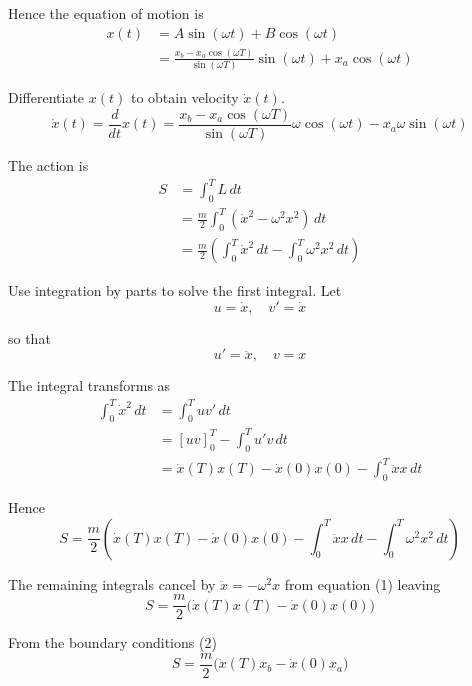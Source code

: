 Hence the equation of motion is
\begin{align*}
x(t)&=A\sin(\omega t)+B\cos(\omega t)
\\
&=\frac{x_b-x_a\cos(\omega T)}{\sin(\omega T)}\sin(\omega t)+x_a\cos(\omega t)
\tag{3}
\end{align*}

Differentiate $x(t)$ to obtain velocity $\dot x(t)$.
\begin{equation*}
\dot x(t)=\frac{d}{dt}x(t)
=\frac{x_b-x_a\cos(\omega T)}{\sin(\omega T)}\omega\cos(\omega t)-x_a\omega\sin(\omega t)
\tag{4}
\end{equation*}

The action is
\begin{align*}
S&=\int_0^TL\,dt
\\
&=\frac{m}{2}\int_0^T (\dot{x}^2-\omega^2 x^2)\,dt
\\
&=\frac{m}{2}\left(
\int_0^T\dot{x}^2\,dt
-\int_0^T\omega^2x^2\,dt
\right)
\end{align*}

Use integration by parts to solve the first integral.
Let
\begin{equation*}
u=\dot x,\quad v'=\dot x
\end{equation*}

so that
\begin{equation*}
u'=\ddot x,\quad v=x
\end{equation*}

The integral transforms as
\begin{align*}
\int_0^T \dot x^2\,dt
&=\int_0^T uv'\,dt
\\
&=[uv]_0^T
-\int_0^Tu'v\,dt
\\
&=\dot x(T)x(T)-\dot x(0)x(0)-\int_0^T\ddot xx\,dt
\end{align*}

Hence
\begin{equation*}
S=\frac{m}{2}\left(
\dot x(T)x(T)-\dot x(0)x(0)
-\int_0^T \ddot xx\,dt
-\int_0^T\omega^2x^2\,dt
\right)
\end{equation*}

The remaining integrals cancel by $\ddot x=-\omega^2x$ from equation (1) leaving
\begin{equation*}
S=\frac{m}{2}\bigl(\dot x(T)x(T)-\dot x(0)x(0)\bigr)
\tag{5}
\end{equation*}

From the boundary conditions (2)
\begin{equation*}
S=\frac{m}{2}\bigl(\dot x(T)x_b-\dot x(0)x_a\bigr)
\end{equation*}

